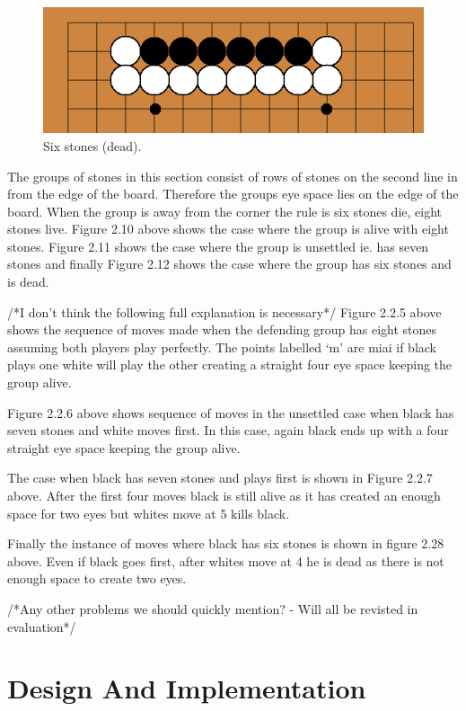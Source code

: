 \documentclass{l3proj}
\begin{document}
\begin{figure}[H]
\centering
\includegraphics[scale=0.5]{Images/sixdie.png}
\caption{Six stones (dead).}
\end{figure}

The groups of stones in this section consist of rows of stones on the second line in from the edge of the board.  Therefore the groups eye space lies on the edge of the board. When the group is away from the corner the rule is six stones die, eight stones live. Figure 2.10 above shows the case where the group is alive with eight stones. Figure 2.11 shows the case where the group is unsettled ie. has seven stones and finally Figure 2.12 shows the case where the group has six stones and is dead.

/*I don't think the following full explanation is necessary*/
Figure 2.2.5 above shows the sequence of moves made when the defending group has eight stones assuming both players play perfectly. The points labelled ‘m’ are miai if black plays one white will play the other creating a straight four eye space keeping the group alive.

Figure 2.2.6 above shows sequence of moves in the unsettled case when black has seven stones and white moves first.  In this case, again black ends up with a four straight eye space keeping the group alive.

The case when black has seven stones and plays first is shown in Figure 2.2.7 above. After the first four moves black is still alive as it has created an enough space for two eyes but whites move at 5 kills black.

Finally the instance of moves where black has six stones is shown in figure 2.28 above. Even if black goes first, after whites move at 4 he is dead as there is not enough space to create two eyes.

/*Any other problems we should quickly mention? - Will all be revisted in evaluation*/

\chapter{Design And Implementation}
\label{design}
\end{document}
